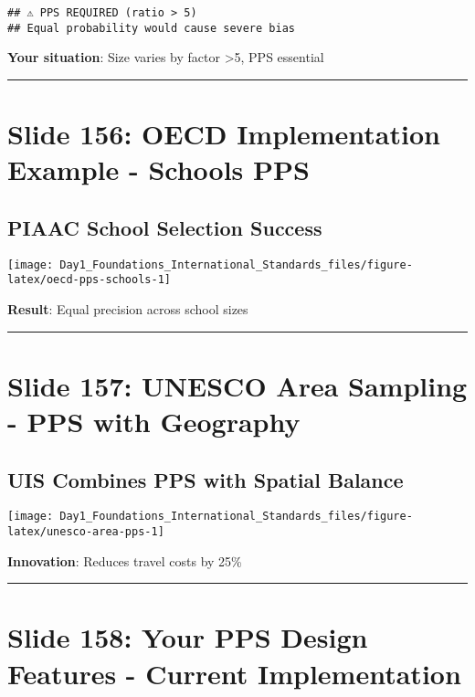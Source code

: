\documentclass[
]{article}
\begin{document}
\begin{verbatim}
## ⚠️ PPS REQUIRED (ratio > 5)
## Equal probability would cause severe bias
\end{verbatim}

\textbf{Your situation}: Size varies by factor \textgreater5, PPS
essential

\begin{center}\rule{0.5\linewidth}{0.5pt}\end{center}

\section{Slide 156: OECD Implementation Example - Schools
PPS}\label{slide-156-oecd-implementation-example---schools-pps}

\subsection{PIAAC School Selection
Success}\label{piaac-school-selection-success}

\texttt{[image: Day1\_Foundations\_International\_Standards\_files/figure-latex/oecd-pps-schools-1]}

\textbf{Result}: Equal precision across school sizes

\begin{center}\rule{0.5\linewidth}{0.5pt}\end{center}

\section{Slide 157: UNESCO Area Sampling - PPS with
Geography}\label{slide-157-unesco-area-sampling---pps-with-geography}

\subsection{UIS Combines PPS with Spatial
Balance}\label{uis-combines-pps-with-spatial-balance}

\texttt{[image: Day1\_Foundations\_International\_Standards\_files/figure-latex/unesco-area-pps-1]}

\textbf{Innovation}: Reduces travel costs by 25\%

\begin{center}\rule{0.5\linewidth}{0.5pt}\end{center}

\section{Slide 158: Your PPS Design Features - Current
Implementation}\label{slide-158-your-pps-design-features---current-implementation}
\end{document}
